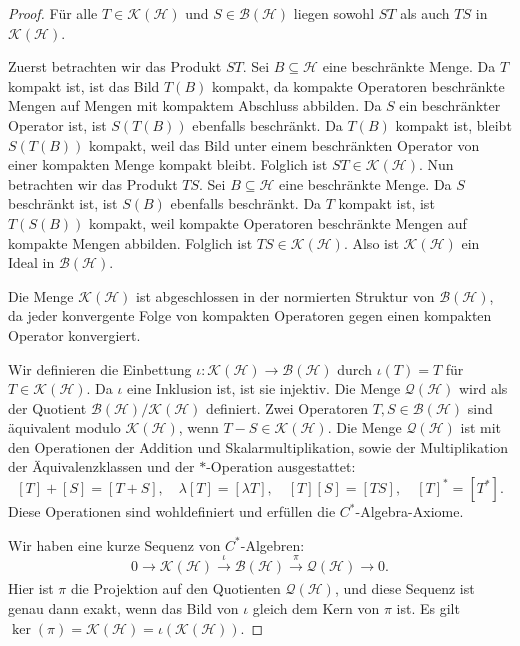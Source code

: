 \documentclass[11pt, hidelinks]{article}
\newcommand{\h}{\mathcal{H}}
\numberwithin{conj}{section}
\begin{document}
\begin{proof}
Für alle $T \in \mathcal{K}(\mathcal{H})$ und $S \in \mathcal{B}(\mathcal{H})$ liegen sowohl $ST$ als auch $TS$ in $\mathcal{K}(\mathcal{H})$. 

Zuerst betrachten wir das Produkt $ST$. Sei $B \subseteq \mathcal{H}$ eine beschränkte Menge. Da $T$ kompakt ist, ist das Bild $T(B)$ kompakt, da kompakte Operatoren beschränkte Mengen auf Mengen mit kompaktem Abschluss abbilden. Da $S$ ein beschränkter Operator ist, ist $S(T(B))$ ebenfalls beschränkt. Da $T(B)$ kompakt ist, bleibt $S(T(B))$ kompakt, weil das Bild unter einem beschränkten Operator von einer kompakten Menge kompakt bleibt. Folglich ist $ST \in \mathcal{K}(\mathcal{H})$. Nun betrachten wir das Produkt $TS$. Sei $B \subseteq \mathcal{H}$ eine beschränkte Menge. Da $S$ beschränkt ist, ist $S(B)$ ebenfalls beschränkt. Da $T$ kompakt ist, ist $T(S(B))$ kompakt, weil kompakte Operatoren beschränkte Mengen auf kompakte Mengen abbilden. Folglich ist $TS \in \mathcal{K}(\mathcal{H})$. Also ist $\mathcal{K}(\mathcal{H})$ ein Ideal in $\mathcal{B}(\mathcal{H})$. 

Die Menge $\mathcal{K}(\mathcal{H})$ ist abgeschlossen in der normierten Struktur von $\mathcal{B}(\mathcal{H})$, da jeder konvergente Folge von kompakten Operatoren gegen einen kompakten Operator konvergiert.

Wir definieren die Einbettung $\iota: \mathcal{K}(\mathcal{H}) \to \mathcal{B}(\mathcal{H})$ durch $\iota(T) = T$ für $T \in \mathcal{K}(\mathcal{H})$. Da $\iota$ eine Inklusion ist, ist sie injektiv. Die Menge $\mathcal{Q}(\mathcal{H})$ wird als der Quotient $\mathcal{B}(\mathcal{H}) / \mathcal{K}(\mathcal{H})$ definiert. Zwei Operatoren $T, S \in \mathcal{B}(\mathcal{H})$ sind äquivalent modulo $\mathcal{K}(\mathcal{H})$, wenn $T - S \in \mathcal{K}(\mathcal{H})$. Die Menge $\mathcal{Q}(\mathcal{H})$ ist mit den Operationen der Addition und Skalarmultiplikation, sowie der Multiplikation der Äquivalenzklassen und der $\ast$-Operation ausgestattet:
   \[
   [T] + [S] = [T + S], \quad \lambda[T] = [\lambda T], \quad [T][S] = [TS], \quad [T]^\ast = [T^\ast].
   \]
Diese Operationen sind wohldefiniert und erfüllen die $C^\ast$-Algebra-Axiome.

Wir haben eine kurze Sequenz von $C^\ast$-Algebren:
   \[
   0 \to \mathcal{K}(\mathcal{H}) \xrightarrow[]{\iota} \mathcal{B}(\mathcal{H}) \xrightarrow[]{\pi} \mathcal{Q}(\mathcal{H}) \to 0.
   \]
Hier ist $\pi$ die Projektion auf den Quotienten $\mathcal{Q}(\mathcal{H})$, und diese Sequenz ist genau dann exakt, wenn das Bild von $\iota$ gleich dem Kern von $\pi$ ist. Es gilt $\ker(\pi) = \mathcal{K}(\h) = \iota(\mathcal{K}(\h))$.
\end{proof}
\end{document}
